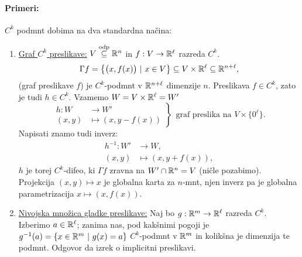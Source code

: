 \paragraph{Primeri:}
$C^k$ podmnt dobima na dva standardna na\v cina:
\begin{enumerate}
	\item{\underline{Graf $C^k$ preslikave:}
	$V \stackrel{\text{odp}}{\subseteq} \mathbb{R}^n$ in $f : V \to \mathbb{R}^\ell$ razreda $C^k$.
	\[
		\Gamma f = \big\{\big(x, f(x)\big)\ |\ x \in V\big\} \subseteq V \times \mathbb{R}^\ell \subseteq \mathbb{R}^{n + \ell},
	\]
	(graf preslikave $f$) je  $C^k$-podmnt v $\mathbb{R}^{n + \ell}$ dimenzije $n$. Preslikava $f \in C^k$, zato je tudi
	$h \in C^k$. Vzamemo $W = V \times \mathbb{R}^\ell = W'$
	\[
		\left.\begin{array}{rl}
		h : W &\to W' \\
		(x,y) &\mapsto (x, y - f(x))
		\end{array} \right\}\ \ \text{graf preslika na $V \times \{0^\ell\}$.}
	\]
	Napisati znamo tudi inverz:
	\begin{align*}
		h^{-1} : W' &\to W, \\
		(x,y) &\mapsto (x, y + f(x)),
	\end{align*}
	$h$ je torej $C^k$-difeo, ki $\Gamma f$ zravna na $W' \cap \mathbb{R}^n = V$ (ni\v cle pozabimo).
	Projekcija $(x, y) \mapsto x$ je globalna karta za $n$-mnt, njen inverz pa je globalna parametrizacija $x \mapsto (x, f(x))$.}
	\item{\underline{Nivojska mno\v zica gladke preslikave:} Naj bo $g : \mathbb{R}^m \to \mathbb{R}^\ell$ razreda $C^k$. Izberimo $a \in \mathbb{R}^\ell$; zanima nas,
	pod kak\v snimi pogoji je $g^{-1} (a) = \{x \in \mathbb{R}^m\ |\ g(x) = a\}$ $C^k$-podmnt v $\mathbb{R}^m$ in kolik\v sna je dimenzija te podmnt. Odgovor
	da izrek o implicitni preslikavi.}
\end{enumerate}

